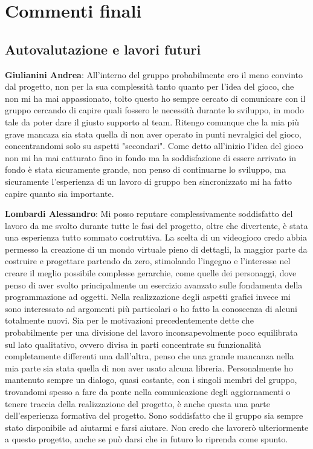 \documentclass[a4paper,12pt, hidelinks]{report}
\begin{document}
\chapter{Commenti finali}


\section{Autovalutazione e lavori futuri}

	\item \textbf{Giulianini Andrea}: All'interno del gruppo probabilmente ero il meno convinto dal progetto, non per la sua complessità tanto quanto per l'idea del gioco, che non mi ha mai appassionato, tolto questo ho sempre cercato di comunicare con il gruppo cercando di capire quali fossero le necessità durante lo sviluppo, in modo tale da poter dare il giusto supporto al team. Ritengo comunque che la mia più grave mancaza sia stata quella di non aver operato in punti nevralgici del gioco, concentrandomi solo su aspetti "secondari".
	Come detto all'inizio l'idea del gioco non mi ha mai catturato fino in fondo ma la soddisfazione di essere arrivato in fondo è stata sicuramente grande, non penso di continuarne lo sviluppo, ma sicuramente l'esperienza di un lavoro di gruppo ben sincronizzato mi ha fatto capire quanto sia importante.

	\item \textbf{Lombardi Alessandro}: Mi posso reputare complessivamente soddisfatto del lavoro da me svolto durante tutte le fasi del progetto, oltre che divertente, è stata una esperienza tutto sommato costruttiva. La scelta di un videogioco credo abbia permesso la creazione di un mondo virtuale pieno di dettagli, la maggior parte da costruire e progettare partendo da zero, stimolando l'ingegno e l'interesse nel creare il meglio possibile complesse gerarchie, come quelle dei personaggi, dove penso di aver svolto principalmente un esercizio avanzato sulle fondamenta della programmazione ad oggetti. Nella realizzazione degli aspetti grafici invece mi sono interessato ad argomenti più particolari o ho fatto la conoscenza di alcuni totalmente nuovi. Sia per le motivazioni precedentemente dette che probabilmente per una divisione del lavoro inconsapevolmente poco equilibrata sul lato qualitativo, ovvero divisa in parti concentrate su funzionalità completamente differenti una dall'altra, penso che una grande mancanza nella mia parte sia stata quella di non aver usato alcuna libreria. Personalmente ho mantenuto sempre un dialogo, quasi costante, con i singoli membri del gruppo, trovandomi spesso a fare da ponte nella comunicazione degli aggiornamenti o tenere traccia della realizzazione del progetto, è anche questa una parte dell'esperienza formativa del progetto. Sono soddisfatto che il gruppo sia sempre stato disponibile ad aiutarmi e farsi aiutare. Non credo che lavorerò ulteriormente a questo progetto, anche se può darsi che in futuro lo riprenda come spunto.
\end{document}
